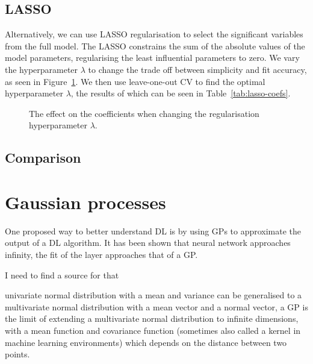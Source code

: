 \subsection{LASSO}

Alternatively, we can use \ac{LASSO} regularisation to select the significant variables from the full model.
The \ac{LASSO} constrains the sum of the absolute values of the model parameters, regularising the least influential parameters to zero.
We vary the hyperparameter \(\lambda\) to change the trade off between simplicity and fit accuracy, as seen in Figure~\ref{fig:lasso-lambda}.
We then use leave-one-out \ac{CV} to find the optimal hyperparameter \(\lambda\), the results of which can be seen in Table~\ref{tab:lasso-coefs}.

\begin{figure}[htbp]
	\centering
	
	\caption{The effect on the coefficients when changing the regularisation hyperparameter \(\lambda\).}
	\label{fig:lasso-lambda}
\end{figure}


\subsection{Comparison}


\section{Gaussian processes}

One proposed way to better understand \ac{DL} is by using \acp{GP} to approximate the output of a \ac{DL} algorithm.
It has been shown that  neural network approaches infinity, the fit of the layer approaches that of a \ac{GP}.

\begin{todo}
I need to find a source for that
\end{todo}

 univariate normal distribution with a mean and variance can be generalised to a multivariate normal distribution with a mean vector and a normal vector, a \ac{GP} is the limit of extending a multivariate normal distribution to infinite dimensions, with a mean function and covariance function (sometimes also called a kernel in machine learning environments) which depends on the distance between two points.

